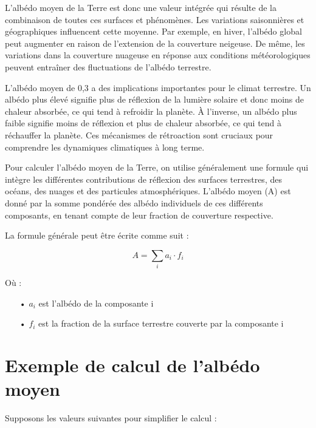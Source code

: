 \documentclass[a4paper,11pt]{article}
\begin{document}
L'albédo moyen de la Terre est donc une valeur intégrée qui résulte de la combinaison de toutes ces surfaces et phénomènes. Les variations saisonnières et géographiques influencent cette moyenne. Par exemple, en hiver, l'albédo global peut augmenter en raison de l'extension de la couverture neigeuse. De même, les variations dans la couverture nuageuse en réponse aux conditions météorologiques peuvent entraîner des fluctuations de l'albédo terrestre.

L'albédo moyen de 0,3 a des implications importantes pour le climat terrestre. Un albédo plus élevé signifie plus de réflexion de la lumière solaire et donc moins de chaleur absorbée, ce qui tend à refroidir la planète. À l'inverse, un albédo plus faible signifie moins de réflexion et plus de chaleur absorbée, ce qui tend à réchauffer la planète. Ces mécanismes de rétroaction sont cruciaux pour comprendre les dynamiques climatiques à long terme.


Pour calculer l'albédo moyen de la Terre, on utilise généralement une formule qui intègre les différentes contributions de réflexion des surfaces terrestres, des océans, des nuages et des particules atmosphériques. L'albédo moyen (A) est donné par la somme pondérée des albédo individuels de ces différents composants, en tenant compte de leur fraction de couverture respective. 

La formule générale peut être écrite comme suit :

\[ A = \displaystyle\sum_i a_i \cdot f_i \]

Où :
\begin{enumerate}

\item[•] $a_i$ est l'albédo de la composante i
\item[•] $f_i$ est la fraction de la surface terrestre couverte par la composante i

\end{enumerate}


\section{Exemple de calcul de l'albédo moyen}


Supposons les valeurs suivantes pour simplifier le calcul :
\end{document}
